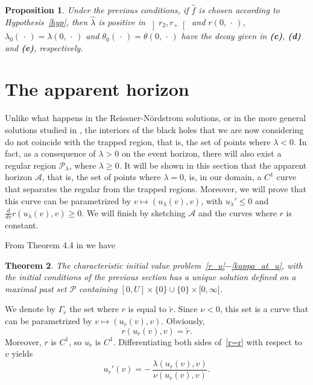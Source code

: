 \documentclass[a4paper,11pt,oneside,reqno]{amsart}
\newtheorem{Thm}{Theorem}[section]
\newtheorem{Prop}[Thm]{Proposition}
\newcommand{\cal}{\mathcal}
\newcommand{\mysigma}{{\cal P}}
\newcommand{\myumax}{U}
\newcommand{\ckr}{\check{r}}
\newcommand{\uckr}{u_{\ckr}}
\begin{document}
\begin{Prop} Under the previous conditions,
if\/ $\hat{f}$ is chosen according to\/ {\rm Hypothesis~\ref{hyp}},
then $\hat\lambda$ is positive in $\left]r_2,r_+\right[$ and
$r(0,\,\cdot\,)$,
$\lambda_0(\,\cdot\,)=\lambda(0,\,\cdot\,)$ and
$\theta_0(\,\cdot\,)=\theta(0,\,\cdot\,)$
have the decay given in\/ {\rm\bf (c)}, {\rm\bf (d)} and\/ {\rm\bf (e)}, respectively.
\end{Prop}

\section{The apparent horizon}\label{section3.5}

Unlike what happens in the Reissner-N\"ordstrom solutions, or in the more general solutions studied in \cite{relIst1, relIst2, relIst3, Dafermos1}, the interiors of the black holes that we are now considering do not coincide with the trapped region, that is, the set of points where $\lambda < 0$. In fact, as a consequence of $\lambda>0$ on the event horizon, there will also exist a regular region ${\cal P}_\lambda$, where $\lambda \geq 0$. It will be shown in this section that the apparent horizon ${\cal A}$, that is, the set of points where $\lambda = 0$, is, in our domain, a $C^1$ curve that separates the regular from the trapped regions. Moreover, we will prove that this curve can be parametrized by $v\mapsto(u_\lambda(v),v)$, with $u_\lambda'\leq 0$ and $\frac{d}{dv}r(u_\lambda(v),v)\geq 0$. We will finish by sketching ${\cal A}$ and the curves where $r$ is constant.

From Theorem 4.4 in \cite{relIst1} we have 
\begin{Thm}\label{maximal} The characteristic initial value problem\/~\eqref{r_u}$-$\eqref{kappa_at_u}, with the initial 
conditions of the previous section
has a unique solution defined on a maximal past set $\mysigma$ containing $[0,\myumax]\times\{0\}\cup\{0\}\times[0,\infty[$.\end{Thm}

We denote by $\Gamma_{\ckr}$ the set where $r$ is equal to $\ckr$. Since $\nu<0$,
this set is a curve that can be parametrized by
$v\mapsto(\uckr(v),v)$. Obviously, 
\begin{equation}\label{r=r}
r(\uckr(v),v)=\ckr.
\end{equation}
Moreover, $r$ is $C^1$, so $\uckr$ is $C^1$. Differentiating both sides of~\eqref{r=r} with respect to $v$ yields
\begin{equation}\label{sobe}
\uckr'(v)=-\,\frac{\lambda(\uckr(v),v)}{\nu(\uckr(v),v)}.
\end{equation}
\end{document}
